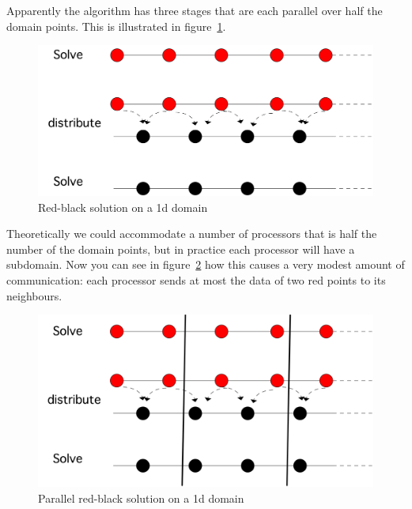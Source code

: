 \begin{displayalgorithm}
\end{displayalgorithm}

Apparently the algorithm has three stages that are each parallel over
half the domain points. This is illustrated in
figure~\ref{fig:1d-rb-solve}.
\begin{figure}[ht]
  \includegraphics[scale=.1]{graphics/red-black-1d-solve}
  \caption{Red-black solution on a 1d domain}
  \label{fig:1d-rb-solve}
\end{figure}
Theoretically we could accommodate a number of processors that is half
the number of the domain points, but in practice each processor will
have a subdomain. Now you can see in figure~\ref{fig:1d-rb-solve-par}
how this causes a very modest amount of communication: each processor
sends at most the data of two red points to its neighbours.
\begin{figure}[ht]
  \includegraphics[scale=.1]{graphics/red-black-1d-solve-par}
  \caption{Parallel red-black solution on a 1d domain}
  \label{fig:1d-rb-solve-par}
\end{figure}

